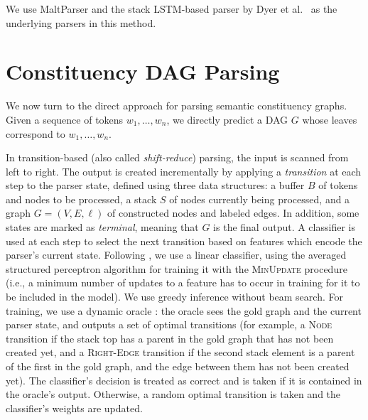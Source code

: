 \documentclass[11pt]{article}
\begin{document}
We use MaltParser \cite{nivre2007maltparser} and the stack LSTM-based parser by Dyer et al.~ as the underlying parsers in this method.

\section{Constituency DAG Parsing}\label{sec:direct_approach}

We now turn to the direct approach for parsing semantic constituency graphs. Given a sequence
of tokens $w_1, \ldots, w_n$, we directly predict a DAG $G$ whose leaves
correspond to  $w_1, \ldots, w_n$.


In transition-based (also called \textit{shift-reduce}) parsing, the input is scanned from left to right.
The output is created incrementally by applying a \textit{transition} at each step to the parser state,
defined using three data structures: a buffer $B$ of tokens and nodes to be processed,
a stack $S$ of nodes currently being processed,
and a graph $G=(V,E,\ell)$ of constructed nodes and labeled edges.
In addition, some states are marked as \textit{terminal}, meaning that $G$ is the final output.
A classifier is used at each step to select the next transition based on features
which encode the parser's current state.
Following , we use a linear classifier, using
the averaged structured perceptron algorithm for training it
\cite{Coll:04} with the \textsc{MinUpdate} \cite{cai2011language} procedure
(i.e., a minimum number of updates to a feature has to occur in training for it
to be included in the model).
We use greedy inference without beam search.
For training, we use a dynamic oracle \cite{goldberg2012dynamic}: the oracle sees the gold graph and the current parser state, and outputs a set of optimal transitions (for example, a \textsc{Node} transition if the stack top has a parent in the gold graph that has not been created yet, and a \textsc{Right-Edge} transition if the second stack element is a parent of the first in the gold graph, and the edge between them has not been created yet). The classifier's decision is treated as correct and is taken if it is contained in the oracle's output. Otherwise, a random optimal transition is taken and the classifier's weights are updated.
\end{document}
